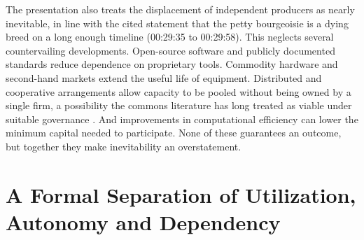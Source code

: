 \documentclass[11pt]{article}
\theoremstyle{plain}
\theoremstyle{definition}
\begin{document}
The presentation also treats the displacement of independent producers as nearly inevitable, in line with the cited statement that the petty bourgeoisie is a dying breed on a long enough timeline (00:29:35 to 00:29:58). This neglects several countervailing developments. Open-source software and publicly documented standards reduce dependence on proprietary tools. Commodity hardware and second-hand markets extend the useful life of equipment. Distributed and cooperative arrangements allow capacity to be pooled without being owned by a single firm, a possibility the commons literature has long treated as viable under suitable governance \cite{ostrom}. And improvements in computational efficiency can lower the minimum capital needed to participate. None of these guarantees an outcome, but together they make inevitability an overstatement.

\section{A Formal Separation of Utilization, Autonomy and Dependency}
\end{document}
